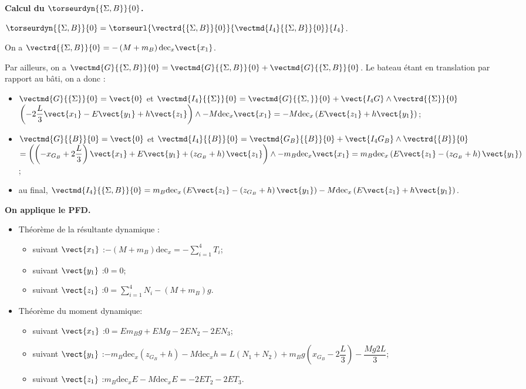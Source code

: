 \documentclass[10pt,fleqn]{article} %
\begin{document}
\begin{multicols}{2}
\begin{corrige}
\textbf{Calcul du $\torseurdyn{\{\Sigma , B\}}{0}$.}

$\torseurdyn{\{\Sigma , B\}}{0} = \torseurl{\vectrd{\{\Sigma , B\}}{0}}{\vectmd{I_4}{\{\Sigma , B\}}{0}}{I_4}$. 

On a $\vectrd{\{\Sigma , B\}}{0}=-\left(M+m_B\right) \text{dec}_x\vect{x_1}$.

Par ailleurs, on a $\vectmd{G}{\{\Sigma , B\}}{0}= \vectmd{G}{\{\Sigma , B\}}{0}+\vectmd{G}{\{\Sigma , B\}}{0}$.
Le bateau étant en translation par rapport au bâti, on a donc :

\begin{itemize}
\item  $\vectmd{G}{\{\Sigma \}}{0}=\vect{0}$ et 
$\vectmd{I_4}{\{\Sigma \}}{0}=\vectmd{G}{\{\Sigma ,\}}{0}+\vect{I_4 G} \wedge \vectrd{\{\Sigma \}}{0} $ $\left(-2\dfrac{L}{3} \vect{x_1}-E\vect{y_1}+h\vect{z_1} \right)\wedge -M\text{dec}_x \vect{x_1}=-M\text{dec}_x \left(E\vect{z_1}+h\vect{y_1}\right)$;
\item  $\vectmd{G}{\{ B\}}{0}=\vect{0}$ et 
$\vectmd{I_4}{\{ B\}}{0}=\vectmd{G_B}{\{ B\}}{0}+\vect{I_4 G_B} \wedge \vectrd{\{ B\}}{0} $ $=\left(\left(-x_{G_B}+2\dfrac{L}{3}\right) \vect{x_1}+E\vect{y_1}+\left(z_{G_B}+h\right) \vect{z_1} \right)\wedge -m_B \text{dec}_x \vect{x_1}=m_B \text{dec}_x \left(E\vect{z_1}-\left(z_{G_B}+h\right) \vect{y_1}\right)$; 
\item au final, $\vectmd{I_4}{\{\Sigma , B\}}{0}=m_B \text{dec}_x \left(E\vect{z_1}-\left(z_{G_B}+h\right) \vect{y_1}\right)-M\text{dec}_x \left(E\vect{z_1}+h\vect{y_1}\right)$.
\end{itemize}

\textbf{On applique le PFD.}
\begin{itemize}
\item Théorème de la résultante dynamique :
\begin{itemize}
\item suivant $\vect{x_1}$ :$-\left(M+m_B\right) \text{dec}_x=-\sum\limits_{i=1}^{4} T_i$;
\item suivant $\vect{y_1}$ :$0=0$;
\item suivant $\vect{z_1}$ :$0=\sum\limits_{i=1}^{4} N_i-\left(M+m_B\right)g$.
\end{itemize}
\item Théorème du moment dynamique:
\begin{itemize}
\item suivant $\vect{x_1}$ :$0=Em_B g+EM g-2EN_2-2EN_3 $;
\item suivant $\vect{y_1}$ :$-m_B \text{dec}_x \left(z_{G_B}+h\right)-M\text{dec}_x h=L\left(N_1+N_2 \right)+m_B g\left(x_{G_B}-2\dfrac{L}{3}\right)-\dfrac{M g2L}{3} $;
\item suivant $\vect{z_1}$ :$ m_B \text{dec}_x E-M\text{dec}_x E=-2ET_2-2ET_3$.
\end{itemize}
\end{itemize}



\end{corrige}
\end{multicols}
\end{document}
